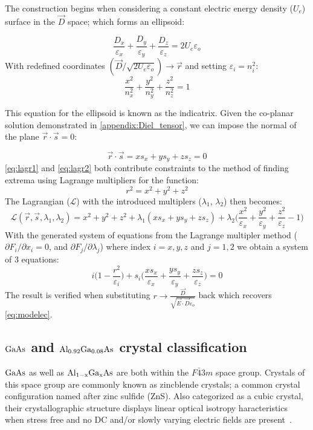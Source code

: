 The construction begins when considering a constant electric energy density ($U_e$) surface in the $\vec{D}$ space; which forms an ellipsoid: 

\begin{equation}\label{eq:lagr1}
\frac{D_x}{\varepsilon_x} + \frac{D_y}{\varepsilon_y} + \frac{D_z}{\varepsilon_z} = 2 U_e \varepsilon_o
\end{equation}
With redefined coordinates $(\vec{D}/\sqrt{2 U_e \varepsilon_o}) \rightarrow \vec{r}$ and setting $\varepsilon_i = n^2_i$:
\begin{equation}
\frac{x^2}{n_x^2} + \frac{y^2}{n_y^2} + \frac{z^2}{n_z^2} = 1
\end{equation}

This equation for the ellipsoid is known as the indicatrix. Given the co-planar solution demonstrated in \autoref{appendix:Diel_tensor}, we can impose the normal of the plane $\vec{r} \cdot \vec{s} = 0$:

\begin{equation}\label{eq:lagr2}
\vec{r} \cdot \vec{s} = x s_x + y s_y + z s_z = 0
\end{equation}
\autoref{eq:lagr1} and \autoref{eq:lagr2} both contribute constraints to the method of finding extrema using Lagrange multipliers for the function:
\begin{equation}
r^2 = x^2 + y^2 + z^2
\end{equation}
The Lagrangian ($\mathcal{L}$) with the introduced multiplers ($\lambda_1$, $\lambda_2$) then becomes:
\begin{equation}
\mathcal{L}(\vec{r},\vec{s},\lambda_1, \lambda_2) =
x^2 + y^2 + z^2 + \lambda_1 (xs_x + ys_y + zs_z) + \lambda_2 \bigg( \frac{x^2}{\varepsilon_x} + \frac{y^2}{\varepsilon_y} + \frac{z^2}{\varepsilon_z} - 1 \bigg)
\end{equation}
With the generated system of equations from the Lagrange multipler method ($\partial F_i/ \partial x_i = 0$, and $\partial F_j/ \partial \lambda_j$) where index $i =x,y,z$ and $j = 1,2$ we obtain a system of 3 equations:
\begin{equation}
i \bigg(1-\frac{r^2}{\varepsilon_{i}} \bigg) + s_{i} \bigg(\frac{x s_x}{\varepsilon_x} + \frac{y s_y}{\varepsilon_y} + \frac{z s_z}{\varepsilon_z} \bigg) = 0
\end{equation}
The result is verified when substituting $r \rightarrow \frac{\vec{D}}{\sqrt{\vec{E} \cdot \vec{D} \varepsilon_o}}$ back which recovers \autoref{eq:modelec}.
\\
\subsection{\texorpdfstring{$\mathrm{GaAs}$}{gaas} and \texorpdfstring{$\mathrm{Al_{0.92}Ga_{0.08}As}$}{algaas} crystal classification}
$\mathrm{GaAs}$ as well as $\mathrm{Al_{1-x}Ga_{x}As}$ are both within the $F\bar{4}3m$ space group. Crystals of this space group are commonly known as zincblende crystals; a common crystal configuration named after zinc sulfide (ZnS). Also categorized as a cubic crystal, their crystallographic structure displays linear optical isotropy haracteristics when stress free and no DC and/or slowly varying electric fields are present~\cite{boyd:2008}. 

